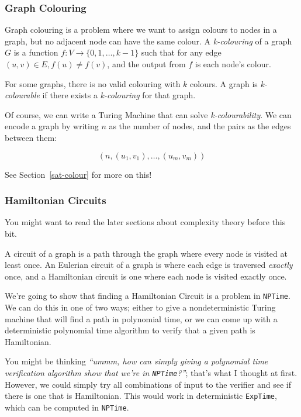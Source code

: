 \subsubsection{Graph Colouring}

Graph colouring is a problem where we want to assign colours to nodes in a
graph, but no adjacent node can have the same colour. A \textit{k-colouring} of
a graph $G$ is a function $f : V \rightarrow \{ 0, 1, \dots, k - 1 \}$ such that
for any edge $(u, v) \in E, f(u) \neq f(v)$, and the output from $f$ is each
node's colour.

For some graphs, there is no valid colouring with $k$ colours. A graph is
\textit{k-colourable} if there exists a \textit{k-colouring} for that graph.

Of course, we can write a Turing Machine that can solve
\textit{k-colourability}. We can encode a graph by writing $n$ as the number of
nodes, and the pairs as the edges between them:

\[
  (n, (u_1, v_1), \dots, (u_m, v_m))
\]

See Section~\ref{sat-colour} for more on this!

\subsubsection{Hamiltonian Circuits}

{\tiny \vspace{-2em} You might want to read the later sections about complexity 
theory before this bit.}

A circuit of a graph is a path through the graph where every node is visited at
least once. An Eulerian circuit of a graph is where each edge is traversed
\textit{exactly} once, and a Hamiltonian circuit is one where each node is
visited exactly once.


We're going to show that finding a Hamiltonian Circuit is a problem in
\texttt{NPTime}. We can do this in one of two ways; either to give a
nondeterministic Turing machine that will find a path in polynomial time, or we
can come up with a deterministic polynomial time algorithm to verify that a
given path is Hamiltonian.

You might be thinking \textit{``ummm, how can simply giving a polynomial time
verification algorithm show that we're in \texttt{NPTime}?''}; that's what I
thought at first. However, we could simply try all combinations of input to the
verifier and see if there is one that is Hamiltonian. This would work in
deterministic \texttt{ExpTime}, which can be computed in \texttt{NPTime}.

